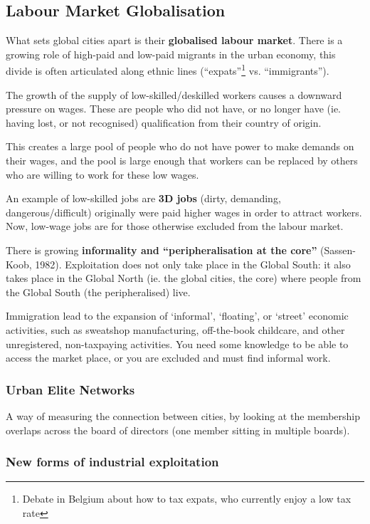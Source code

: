 \documentclass{article}
\begin{document}
\subsection{Labour Market Globalisation}

What sets global cities apart is their \textbf{globalised labour market}. There is a growing role of high-paid and low-paid migrants in the urban economy, this divide is often articulated along ethnic lines (``expats''\footnote{Debate in Belgium about how to tax expats, who currently enjoy a low tax rate} vs. ``immigrants'').

The growth of the supply of low-skilled/deskilled workers causes a downward pressure on wages. These are people who did not have, or no longer have (ie. having lost, or not recognised) qualification from their country of origin.

This creates a large pool of people who do not have power to make demands on their wages, and the pool is large enough that workers can be replaced by others who are willing to work for these low wages.

An example of low-skilled jobs are \textbf{3D jobs} (dirty, demanding, dangerous/difficult) originally were paid higher wages in order to attract workers. Now, low-wage jobs are for those otherwise excluded from the labour market.

There is growing \textbf{informality and ``peripheralisation at the core''} (Sassen-Koob, 1982). Exploitation does not only take place in the Global South: it also takes place in the Global North (ie. the global cities, the core) where people from the Global South (the peripheralised) live.

Immigration lead to the expansion of `informal', `floating', or `street' economic activities, such as sweatshop manufacturing, off-the-book childcare, and other unregistered, non-taxpaying activities. You need some knowledge to be able to access the market place, or you are excluded and must find informal work.

\subsubsection{Urban Elite Networks}

A way of measuring the connection between cities, by looking at the membership overlaps across the board of directors (one member sitting in multiple boards).
 
 \subsubsection{New forms of industrial exploitation}
 
\end{document}
